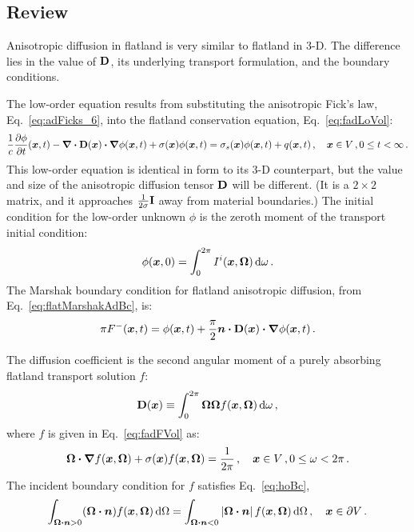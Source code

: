 \subsection{Review}

Anisotropic diffusion in flatland is very similar to flatland in 3-D. The
difference lies in the value of $\mathbf{D}$, its underlying transport formulation,
and the boundary conditions.

The low-order equation results from substituting the anisotropic Fick's law,
Eq.~\eqref{eq:adFicks_6}, into the flatland conservation equation,
Eq.~\eqref{eq:fadLoVol}:
\begin{equation*}
\frac{1}{c} \frac{\partial \phi}{\partial t} (\bm{x}, t)
  - \bm{\nabla} \bm{\cdot} \mathbf{D}(\bm{x}) \bm{\cdot} \bm{\nabla} \phi(\bm{x}, t)
  + \sigma(\bm{x}) \phi(\bm{x}, t)
  = \sigma_s(\bm{x}) \phi(\bm{x},t) + q(\bm{x},t)\,,\quad \bm{x}\in V\,,
  0 \le t < \infty\,.
\end{equation*}
This low-order equation is identical in form to its 3-D counterpart, but the
value and size of the anisotropic diffusion tensor $\mathbf{D}$ will be different.
(It is a $2\times 2$ matrix, and it approaches $\frac{1}{2\sigma}
\mathbf{I}$ away from material boundaries.)
The initial condition for the low-order unknown $\phi$ is the zeroth moment of
the transport initial condition:
\begin{equation*}
  \phi(\bm{x},0) = \int_{0}^{2\pi} I^i(\bm{x},\bm{\Omega}) \mathop{}\!\mathrm{d}\omega\,.
\end{equation*}
The Marshak boundary condition for flatland anisotropic diffusion, from
Eq.~\eqref{eq:flatMarshakAdBc}, is:
\begin{equation*}
\pi F^-(\bm{x},t) 
=
\phi(\bm{x},t)
+ \frac{\pi}{2}\bm{n} \bm{\cdot} \mathbf{D}(\bm{x}) \bm{\cdot} \bm{\nabla} \phi(\bm{x},t) \,.
\end{equation*}

The diffusion coefficient is the second angular moment of a purely absorbing
flatland transport solution $f$:
\begin{equation}\label{eq:flatDDefinition}
  \mathbf{D}(\bm{x}) \equiv \int_{0}^{2\pi} \bm{\Omega} \bm{\Omega}
  f(\bm{x}, \bm{\Omega}) \mathop{}\!\mathrm{d}\omega \,,
\end{equation}
where $f$ is given in Eq.~\eqref{eq:fadFVol} as:
\begin{equation*}
  \bm{\Omega}\bm{\cdot} \bm{\nabla} f(\bm{x}, \bm{\Omega})
  + \sigma(\bm{x}) f (\bm{x}, \bm{\Omega})
= \frac{1}{2\pi} \,, \quad \bm{x}\in V\,, 0 \le \omega < 2\pi \,.
\end{equation*}
The incident boundary condition for $f$ satisfies Eq.~\eqref{eq:hoBc},
\begin{equation*}
  \int_{\bm{\Omega}\bm{\cdot}\bm{n} > 0} (\bm{\Omega}\bm{\cdot} \bm{n})
  f(\bm{x}, \bm{\Omega}) \mathop{}\!\mathrm{d}\Omega
  =
  \int_{\bm{\Omega}\bm{\cdot}\bm{n} < 0} \left| \bm{\Omega}\bm{\cdot} \bm{n} \right|
  f(\bm{x}, \bm{\Omega}) \mathop{}\!\mathrm{d}\Omega\,, \quad \bm{x}\in \partial V \,.
\end{equation*}

